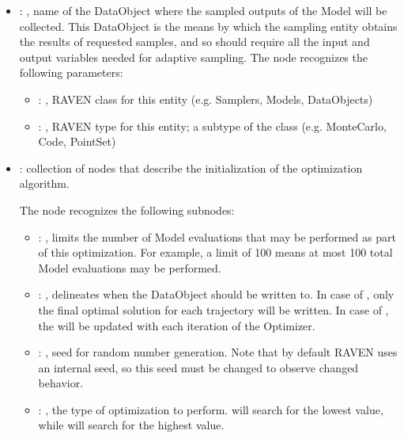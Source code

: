 \begin{itemize}
    \item {}: ,
      name of the DataObject where the sampled outputs of the Model will be collected.
      This DataObject is the means by which the sampling entity obtains the results of requested
      samples, and so should require all the input and output variables needed for adaptive
      sampling.
      The  node recognizes the following parameters:
        \begin{itemize}
          \item {}: ,
            RAVEN class for this entity (e.g. Samplers, Models, DataObjects)
          \item {}: ,
            RAVEN type for this entity; a subtype of the class (e.g. MonteCarlo, Code, PointSet)
      \end{itemize}

    \item {}:
      collection of nodes that describe the initialization of the optimization algorithm.

      The  node recognizes the following subnodes:
      \begin{itemize}
        \item {}: ,
          limits the number of Model evaluations that may be performed as part of this optimization.
          For example, a limit of 100 means at most 100 total Model evaluations may be performed.

        \item {}: ,
          delineates when the  DataObject should be written to. In case
          of , only the final optimal solution for each trajectory will be written.
          In case of , the  will be updated with each
          iteration               of the Optimizer.

        \item {}: ,
          seed for random number generation. Note that by default RAVEN uses an internal seed,
          so this seed must be changed to observe changed behavior. 

        \item {}: ,
          the type of optimization to perform.  will search for the lowest
           value, while  will search for the highest value.
      \end{itemize}


\end{itemize}
